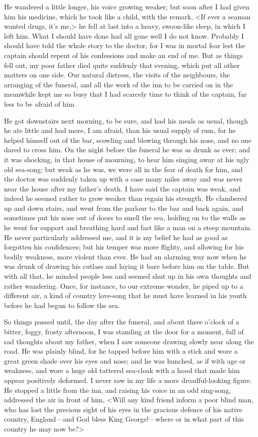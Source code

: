He wandered a little longer, his voice growing weaker; but soon after I had given him his medicine, which he took like a child, with the remark, <If ever a seaman wanted drugs, it's me,> he fell at last into a heavy, swoon-like sleep, in which I left him. What I should have done had all gone well I do not know. Probably I should have told the whole story to the doctor, for I was in mortal fear lest the captain should repent of his confessions and make an end of me. But as things fell out, my poor father died quite suddenly that evening, which put all other matters on one side. Our natural distress, the visits of the neighbours, the arranging of the funeral, and all the work of the inn to be carried on in the meanwhile kept me so busy that I had scarcely time to think of the captain, far less to be afraid of him.

He got downstairs next morning, to be sure, and had his meals as usual, though he ate little and had more, I am afraid, than his usual supply of rum, for he helped himself out of the bar, scowling and blowing through his nose, and no one dared to cross him. On the night before the funeral he was as drunk as ever; and it was shocking, in that house of mourning, to hear him singing away at his ugly old sea-song; but weak as he was, we were all in the fear of death for him, and the doctor was suddenly taken up with a case many miles away and was never near the house after my father's death. I have said the captain was weak, and indeed he seemed rather to grow weaker than regain his strength. He clambered up and down stairs, and went from the parlour to the bar and back again, and sometimes put his nose out of doors to smell the sea, holding on to the walls as he went for support and breathing hard and fast like a man on a steep mountain. He never particularly addressed me, and it is my belief he had as good as forgotten his confidences; but his temper was more flighty, and allowing for his bodily weakness, more violent than ever. He had an alarming way now when he was drunk of drawing his cutlass and laying it bare before him on the table. But with all that, he minded people less and seemed shut up in his own thoughts and rather wandering. Once, for instance, to our extreme wonder, he piped up to a different air, a kind of country love-song that he must have learned in his youth before he had begun to follow the sea.

So things passed until, the day after the funeral, and about three o'clock of a bitter, foggy, frosty afternoon, I was standing at the door for a moment, full of sad thoughts about my father, when I saw someone drawing slowly near along the road. He was plainly blind, for he tapped before him with a stick and wore a great green shade over his eyes and nose; and he was hunched, as if with age or weakness, and wore a huge old tattered sea-cloak with a hood that made him appear positively deformed. I never saw in my life a more dreadful-looking figure. He stopped a little from the inn, and raising his voice in an odd sing-song, addressed the air in front of him, <Will any kind friend inform a poor blind man, who has lost the precious sight of his eyes in the gracious defence of his native country, England—and God bless King George!—where or in what part of this country he may now be?>

